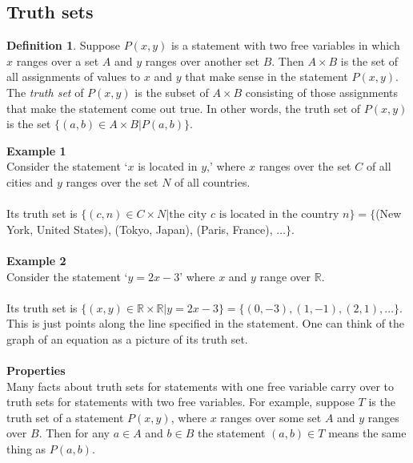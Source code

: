 \documentclass{report}
\theoremstyle{definition}
\newtheorem*{definition}{Definition}
\begin{document}
\subsection{Truth sets}
\begin{definition}
Suppose $P(x,y)$ is a statement with two free variables in which $x$ ranges over a set $A$ and $y$ ranges over another set $B$. Then $A\times B$ is the set of all assignments of values to $x$ and
$y$ that make sense in the statement $P(x,y)$. The \textit{truth set} of $P(x,y)$ is the subset of $A\times B$ consisting of those assignments that make the statement come out true. 
In other words, the truth set of $P(x,y)$ is the set $\{(a,b)\in A\times B|P(a,b)\}$.
\end{definition}
\noindent\textbf{Example 1}\\
Consider the statement `$x$ is located in $y$,' where $x$ ranges over the set $C$ of all cities and $y$ ranges over the set $N$ of all countries.\\
\vspace{1mm}\\
Its truth set is $\{(c,n)\in C\times N|\text{the city $c$ is located in the country $n$}\}=\{$(New York, United States), (Tokyo, Japan), (Paris, France), $\ldots\}$.\\
\vspace{1mm}\\
\textbf{Example 2}\\
Consider the statement `$y=2x-3$' where $x$ and $y$ range over $\mathbb R$.\\
\vspace{1mm}\\
Its truth set is $\{(x,y)\in\mathbb R\times\mathbb R|y=2x-3\}=\{(0,-3),(1,-1),(2,1),\ldots\}$. This
is just points along the line specified in the statement. One can think of the graph of an 
equation as a picture of its truth set.\\
\vspace{1mm}\\
\textbf{Properties}\\
Many facts about truth sets for statements with one free variable carry over to truth sets for statements with two free variables. For example, suppose $T$ is the truth set of a statement $P(x,y)$, 
where $x$ ranges over some set $A$ and $y$ ranges over $B$. Then for any $a\in A$ and $b\in B$ the statement $(a,b)\in T$ means the same thing as $P(a,b)$.\\
\vspace{1mm}\\
\end{document}
